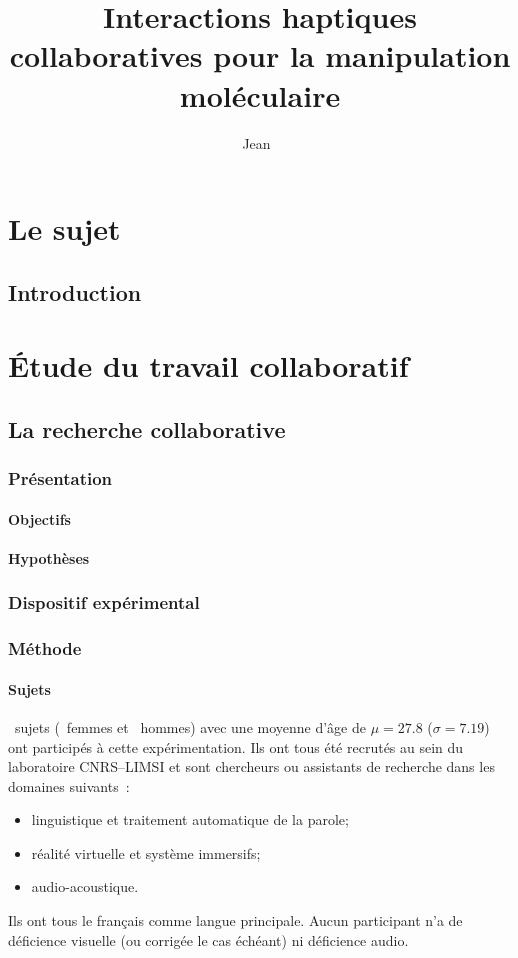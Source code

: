 \documentclass[myfrancais]{mythesis}
\title{Interactions haptiques collaboratives pour la manipulation moléculaire}
\author{Jean~\name{Simard}}
\date{\mydate[datestyle=long]{01/12/2011}}
\newcommand{\acro}[1]{\textsc{#1}}
\newcommand{\mynum}[1]{\nombre{#1}}
\newcommand{\LIMSI}{\acro{CNRS--LIMSI}\xspace}
\begin{document}
	\frontmatter
	\maketitle
	\mytoc
	\mylof
	\mylot
	\mylotodo
	\mainmatter
	\part{Le sujet}
	\chapter{Introduction}
	\part{Étude du travail collaboratif}
	\chapter{La recherche collaborative}
	\section{Présentation}
	\subsection{Objectifs}
	\subsection{Hypothèses}
	\section{Dispositif expérimental}
	\section{Méthode}
	\subsection{Sujets}
	\mynum{24}~sujets (\mynum{4}~femmes et \mynum{20}~hommes) avec une moyenne d'âge de $\mu = 27.8$ ($\sigma = 7.19$) ont participés à cette expérimentation.
	Ils ont tous été recrutés au sein du laboratoire \LIMSI et sont chercheurs ou assistants de recherche dans les domaines suivants~:
	\begin{itemize}
		\item linguistique et traitement automatique de la parole;
		\item réalité virtuelle et système immersifs;
		\item audio-acoustique.
	\end{itemize}
	Ils ont tous le français comme langue principale.
	Aucun participant n'a de déficience visuelle (ou corrigée le cas échéant) ni déficience audio.
	
\end{document}
